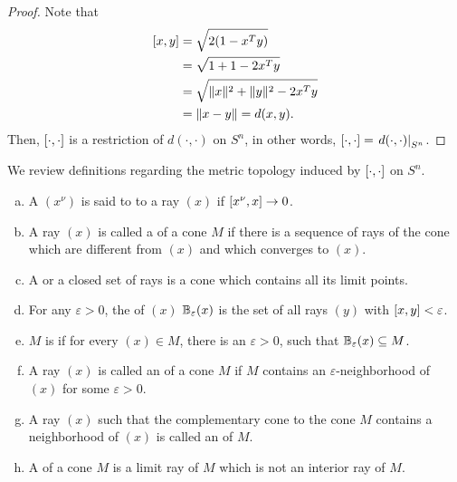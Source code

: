 \documentclass[11pt,a4paper]{article}
\begin{document}
\begin{proof}
    Note that 
    \begin{align*}
        [x, y] &= \sqrt{2(1 - x^Ty)} \\
        &= \sqrt{1 + 1 - 2x^Ty} \\
        &= \sqrt{\|x\|^2 + \|y\|^2 - 2x^Ty} \\
        &= \|x-y\| = d(x,y).
    \end{align*}
    Then, $[\cdot, \cdot]$ is a restriction of $d(\cdot,\cdot)$ on $S^n$, in other words, $[\cdot, \cdot] = \left.d(\cdot,\cdot)\right|_{S^n}$. 
\end{proof}


\begin{definition}\label{def:cone_topology}
    We review definitions regarding the metric topology induced by $[\cdot, \cdot]$ on $S^n$.
    \begin{enumerate}[(a)]
        \item A  $(x^\nu)$ is said to  to a ray $(x)$ if $[x^\nu, x]\rightarrow 0$. 
        \item A ray $(x)$ is called a  of a cone $M$ if there is a sequence of rays of the cone which are different from $(x)$ and which converges to $(x)$. 
        \item A  or a closed set of rays is a cone which contains all its limit points. 
        \item For any $\varepsilon>0$, the  of $(x)$ $\mathbb{B}_\varepsilon(x)$ is the set of all rays $(y)$ with $[x, y] < \varepsilon$.
        \item $M$ is  if for every $(x)\in M$, there is an $\varepsilon>0$, such that $\mathbb{B}_\varepsilon(x)\subseteq M$.
        \item A ray $(x)$ is called an  of a cone $M$ if $M$ contains an $\varepsilon$-neighborhood of $(x)$ for some $\varepsilon>0$.
        \item A ray $(x)$ such that the complementary cone to the cone $M$ contains a neighborhood of $(x)$ is called an  of $M$.
        \item A  of a cone $M$ is a limit ray of $M$ which is not an interior ray of $M$.
    \end{enumerate}
\end{definition}
\end{document}
